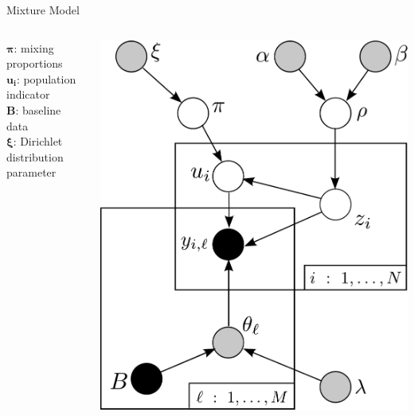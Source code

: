 \documentclass[letter,graphicx]{beamer}
\begin{document}
\begin{frame}{Mixture Model}
\begin{columns}[c]

\column{2in}
$\boldsymbol{\pi}$: mixing proportions \\
\vspace{3mm}
$\boldsymbol{u_i}$: population indicator \\
\vspace{3mm}
$\boldsymbol{B}$: baseline data\\
\vspace{3mm}
$\boldsymbol{\xi}$: Dirichlet distribution parameter

\column{2.25in}
\includegraphics[width=.9\textwidth]{images/DAG_2.pdf}

\end{columns}
\end{frame}
\end{document}

